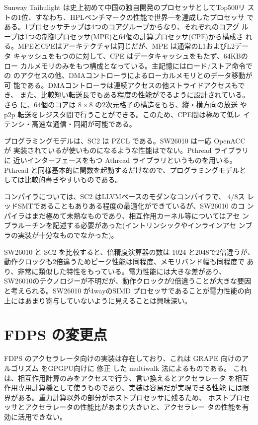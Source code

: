 \documentclass[a4j]{jarticle}
\begin{document}
Sunway Taihulight は史上初めて中国の独自開発のプロセッサとしてTop500リ
ストの1位、すなわち、HPLベンチマークの性能で世界一を達成したプロセッサ
である。1プロセッサチップは4つのコアグループからなり、それぞれのコアグ
ループは1つの制御プロセッサ(MPE)と64個の計算プロセッサ(CPE)から構成さ
れる。MPEとCPEはアーキテクチャは同じだが、MPE は通常のL1およびL2データ
キャッシュをもつのに対して、CPE はデータキャッシュをもたず、64KBのロー
カルメモリのみをもつ構成となっている。主記憶にはロード/ストア命令での
のアクセスの他、DMAコントローラによるローカルメモリとのデータ移動が可
能である。DMAコントローラは連続アクセスの他ストライドアクセスもでき、
また、比較短い転送長でもある程度の性能がでるように設計されている。さら
に、64個のコアは $8\times 8$ の2次元格子の構造をもち、縦・横方向の放送
や p2p 転送をレジスタ間で行うことができる。このため、CPE間は極めて低レ
イテンシ・高速な通信・同期が可能である。

プログラミングモデルは、SC2 は PZCL である。SW26010 は一応 OpenACC が
実装されているが使いものになるような性能はでない。Pthread ライブラリに
近いインターフェースをもつ Athread ライブラリというものを用いる。
Pthread と同様基本的に関数を起動するだけなので、プログラミングモデルと
しては比較的書きやすいものである。

コンパイラについては、SC2 はLLVMベースのモダンなコンパイラで、 4/8ス
レッドSMTであることもありある程度の最適化ができているが、SW26010 のコ
ンパイラはまだ極めて未熟なものであり、相互作用カーネル等についてはアセ
ンブラルーチンを記述する必要があった(イントリンシックやインラインアセ
ンブラの実装が十分なものでなかった)。

SW26010 と SC2 を比較すると、倍精度演算器の数は 1024 と2048で2倍違うが、
動作クロックも2倍違うためピーク性能は同程度、メモリバンド幅も同程度で
あり、非常に類似した特性をもっている。電力性能には大きな差があり、
SW26010のテクノロジーが不明だが、動作クロックが2倍違うことが大きな要因
と考えられる。SW26010 が4wayのSIMD プロセッサであることが電力性能の向
上にはあまり寄与していないように見えることは興味深い。


\section{FDPS の変更点}

FDPS のアクセラレータ向けの実装は存在しており、これは
GRAPE 向けのアルゴリズム\cite{Makino1991c} をGPGPU向けに
修正 \cite{Hamadaetal2009a}した multiwalk 法によるものである。
これは、相互作用計算のみをアクセスで行う、言い換えるとアクセラレータ
を相互作用専用計算機として使うものであり、実装は容易だが実現できる性能
には限界がある。重力計算以外の部分がホストプロセッサに残るため、
ホストプロセッサとアクセラレータの性能比があまり大きいと、アクセラレー
タの性能を有効に活用できない。
\end{document}
